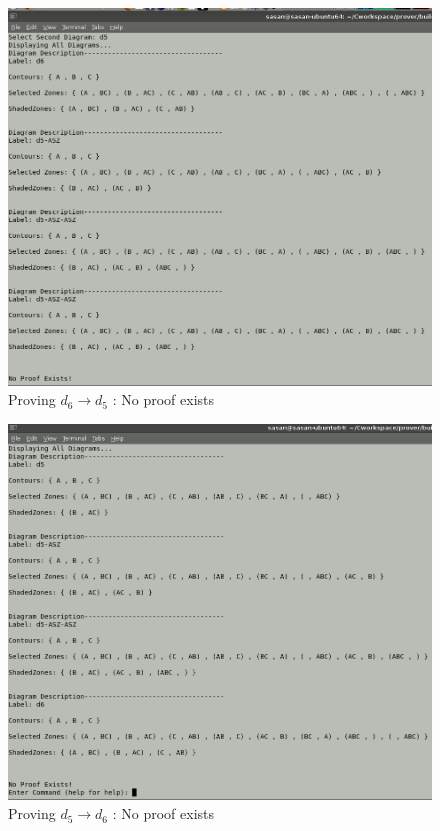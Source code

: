 \documentclass[10pt, a4paper, titlepage]{article}
\begin{document}
\begin{figure}[h]
\centering
\includegraphics[scale=0.4]{images/ss5.png}
\caption{Proving $  d_{6} \rightarrow d_{5} $ : No proof exists}
\label{fig:test3}
\end{figure}


\begin{figure}[h]
\centering
\includegraphics[scale=0.4]{images/ss6.png}
\caption{Proving $  d_{5} \rightarrow d_{6} $ : No proof exists}
\label{fig:test4}
\end{figure}
\end{document}
